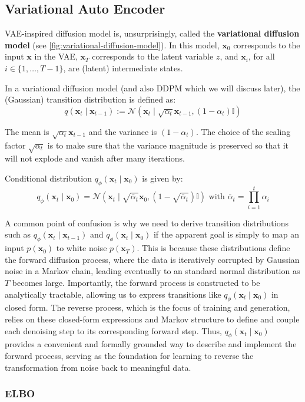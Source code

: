 \documentclass{article}
\newcommand{\x}{\mathbf{x}}
\begin{document}
	\subsection{Variational Auto Encoder}
	
	VAE-inspired diffusion model is, unsurprisingly, called the \textbf{variational diffusion model} (see \autoref{fig:variational-diffusion-model}). In this model, $\x_0$ corresponds to the input $\x$ in the VAE, $\x_T$ corresponds to the latent variable $z$, and $\x_i$, for all $i \in \{1, \dots, T - 1\}$, are (latent) intermediate states.
	
	In a variational diffusion model (and also DDPM which we will discuss later), the (Gaussian) transition distribution is defined as: $$q (\x_t \mid \x_{t-1}) := \mathcal{N}(\x_t \mid \sqrt{\alpha_t} \x_{t-1}, (1 - \alpha_t) \mathbb{I})$$
	
	The mean is $\sqrt{\alpha_t} \x_{t-1}$ and the variance is $(1 - \alpha_t)$. The choice of the scaling factor $\sqrt{\alpha_t}$ is to make sure that the variance magnitude is preserved so that it will not explode and vanish after many iterations.
	
	Conditional distribution $q_\phi (\x_t \mid \x_0)$ is given by: $$q_\phi (\x_t \mid \x_0) = \mathcal{N}(\x_t \mid \sqrt{\bar{\alpha}_t} \x_0, (1 - \sqrt{\bar{\alpha}_t}) \mathbb{I}) \text{ with } \bar{\alpha}_t = \prod_{i=1}^t \alpha_i$$
	
	A common point of confusion is why we need to derive transition distributions such as $q_\phi(\x_t \mid \x_{t-1})$ and $q_\phi(\x_t \mid \x_0)$ if the apparent goal is simply to map an input $p(\x_0)$ to white noise $p(\x_T)$. This is because these distributions define the forward diffusion process, where the data is iteratively corrupted by Gaussian noise in a Markov chain, leading eventually to an standard normal distribution as $T$ becomes large. Importantly, the forward process is constructed to be analytically tractable, allowing us to express transitions like $q_\phi(\x_t \mid \x_0)$ in closed form. The reverse process, which is the focus of training and generation, relies on these closed-form expressions and Markov structure to define and couple each denoising step to its corresponding forward step. Thus, $q_\phi(\x_t \mid \x_0)$ provides a convenient and formally grounded way to describe and implement the forward process, serving as the foundation for learning to reverse the transformation from noise back to meaningful data.
	
	\subsubsection*{ELBO}
	
\end{document}

